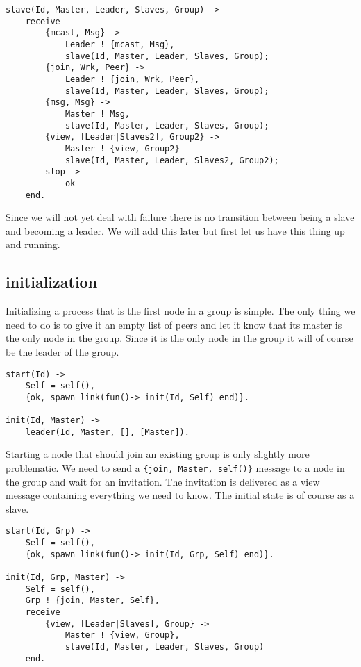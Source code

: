 \documentclass[a4paper,11pt]{article}
\begin{document}
\begin{verbatim}
slave(Id, Master, Leader, Slaves, Group) ->    
    receive
        {mcast, Msg} ->
            Leader ! {mcast, Msg},
            slave(Id, Master, Leader, Slaves, Group);
        {join, Wrk, Peer} ->
            Leader ! {join, Wrk, Peer},
            slave(Id, Master, Leader, Slaves, Group);
        {msg, Msg} ->
            Master ! Msg,
            slave(Id, Master, Leader, Slaves, Group);
        {view, [Leader|Slaves2], Group2} ->
            Master ! {view, Group2}
            slave(Id, Master, Leader, Slaves2, Group2);    
        stop ->
            ok
    end.
\end{verbatim}

Since we will not yet deal with failure there is no transition between
being a slave and becoming a leader. We will add this later but first
let us have this thing up and running.


\subsection{initialization}

Initializing a process that is the first node in a group is
simple. The only thing we need to do is to give it an empty list of
peers and let it know that its master is the only node in the group.
Since it is the only node in the group it will of course be the leader
of the group.

\begin{verbatim}
start(Id) ->
    Self = self(),
    {ok, spawn_link(fun()-> init(Id, Self) end)}.

init(Id, Master) ->
    leader(Id, Master, [], [Master]).
\end{verbatim}

Starting a node that should join an existing group is only slightly
more problematic. We need to send a {\tt\{join, Master, self()\}} message to a
node in the group and wait for an invitation. The invitation is
delivered as a view message containing everything we need to
know. The initial state is of course as a slave.

\begin{verbatim}
start(Id, Grp) ->
    Self = self(),
    {ok, spawn_link(fun()-> init(Id, Grp, Self) end)}.    

init(Id, Grp, Master) ->
    Self = self(), 
    Grp ! {join, Master, Self},
    receive
        {view, [Leader|Slaves], Group} ->
            Master ! {view, Group},
            slave(Id, Master, Leader, Slaves, Group)
    end.
\end{verbatim}
\end{document}
